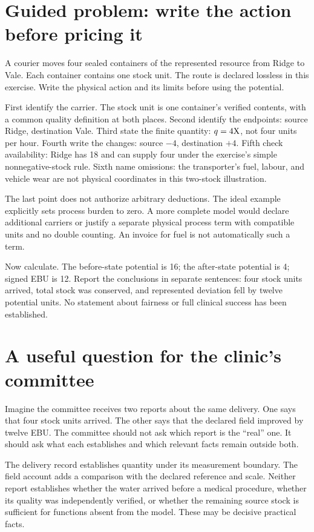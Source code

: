 \section{Guided problem: write the action before pricing it}
A courier moves four sealed containers of the represented resource from Ridge to Vale. Each container contains one stock unit. The route is declared lossless in this exercise. Write the physical action and its limits before using the potential.

First identify the carrier. The stock unit is one container's verified contents, with a common quality definition at both places. Second identify the endpoints: source Ridge, destination Vale. Third state the finite quantity: \(q=4\mathrm{X}\), not four units per hour. Fourth write the changes: source \(-4\), destination \(+4\). Fifth check availability: Ridge has 18 and can supply four under the exercise's simple nonnegative-stock rule. Sixth name omissions: the transporter's fuel, labour, and vehicle wear are not physical coordinates in this two-stock illustration.

The last point does not authorize arbitrary deductions. The ideal example explicitly sets process burden to zero. A more complete model would declare additional carriers or justify a separate physical process term with compatible units and no double counting. An invoice for fuel is not automatically such a term.

Now calculate. The before-state potential is 16; the after-state potential is 4; signed EBU is 12. Report the conclusions in separate sentences: four stock units arrived, total stock was conserved, and represented deviation fell by twelve potential units. No statement about fairness or full clinical success has been established.

\section{A useful question for the clinic's committee}
Imagine the committee receives two reports about the same delivery. One says that four stock units arrived. The other says that the declared field improved by twelve EBU. The committee should not ask which report is the ``real'' one. It should ask what each establishes and which relevant facts remain outside both.

The delivery record establishes quantity under its measurement boundary. The field account adds a comparison with the declared reference and scale. Neither report establishes whether the water arrived before a medical procedure, whether its quality was independently verified, or whether the remaining source stock is sufficient for functions absent from the model. These may be decisive practical facts.

